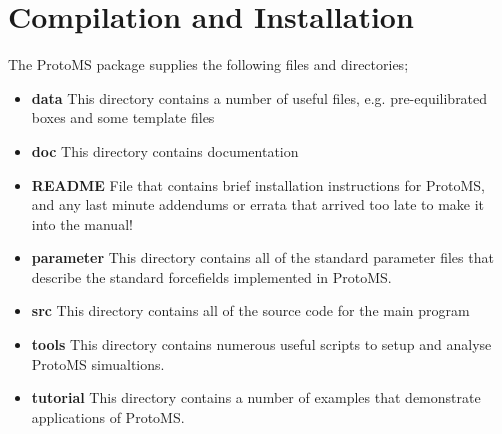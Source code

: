 \documentclass[letterpaper,10pt,english]{sphinxmanual}
\begin{document}
\chapter{Compilation and Installation}
\label{compilation:compilation-and-installation}\label{compilation::doc}
The ProtoMS package supplies the following files and directories;
\begin{itemize}
\item {} 
\textbf{data} This directory contains a number of useful files, e.g. pre-equilibrated boxes and some template files

\item {} 
\textbf{doc} This directory contains documentation

\item {} 
\textbf{README} File that contains brief installation instructions for ProtoMS, and any last minute addendums or errata that arrived too late to make it into the manual!

\item {} 
\textbf{parameter} This directory contains all of the standard parameter files that describe the standard forcefields implemented in ProtoMS.

\item {} 
\textbf{src} This directory contains all of the source code for the main program

\item {} 
\textbf{tools} This directory contains numerous useful scripts to setup and analyse ProtoMS simualtions.

\item {} 
\textbf{tutorial} This directory contains a number of examples that demonstrate applications of ProtoMS.

\end{itemize}
\end{document}
